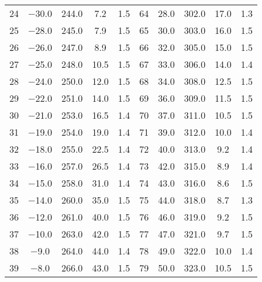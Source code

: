\begin{table}
\begin{tabular}{S S S S S | S S S S S}
      \num{24} &  \num{-30.0} &  \num{244.0} &  \num{ 7.2 } &  \num{1.5} & \num{64} &  \num{ 28.0} &  \num{302.0} &  \num{17.0 } &  \num{1.3} \\ 
      \num{25} &  \num{-28.0} &  \num{245.0} &  \num{ 7.9 } &  \num{1.5} & \num{65} &  \num{ 30.0} &  \num{303.0} &  \num{16.0 } &  \num{1.5} \\ 
      \num{26} &  \num{-26.0} &  \num{247.0} &  \num{ 8.9 } &  \num{1.5} & \num{66} &  \num{ 32.0} &  \num{305.0} &  \num{15.0 } &  \num{1.5} \\ 
      \num{27} &  \num{-25.0} &  \num{248.0} &  \num{10.5 } &  \num{1.5} & \num{67} &  \num{ 33.0} &  \num{306.0} &  \num{14.0 } &  \num{1.4} \\ 
      \num{28} &  \num{-24.0} &  \num{250.0} &  \num{12.0 } &  \num{1.5} & \num{68} &  \num{ 34.0} &  \num{308.0} &  \num{12.5 } &  \num{1.5} \\ 
      \num{29} &  \num{-22.0} &  \num{251.0} &  \num{14.0 } &  \num{1.5} & \num{69} &  \num{ 36.0} &  \num{309.0} &  \num{11.5 } &  \num{1.5} \\ 
      \num{30} &  \num{-21.0} &  \num{253.0} &  \num{16.5 } &  \num{1.4} & \num{70} &  \num{ 37.0} &  \num{311.0} &  \num{10.5 } &  \num{1.5} \\ 
      \num{31} &  \num{-19.0} &  \num{254.0} &  \num{19.0 } &  \num{1.4} & \num{71} &  \num{ 39.0} &  \num{312.0} &  \num{10.0 } &  \num{1.4} \\ 
      \num{32} &  \num{-18.0} &  \num{255.0} &  \num{22.5 } &  \num{1.4} & \num{72} &  \num{ 40.0} &  \num{313.0} &  \num{ 9.2 } &  \num{1.4} \\ 
      \num{33} &  \num{-16.0} &  \num{257.0} &  \num{26.5 } &  \num{1.4} & \num{73} &  \num{ 42.0} &  \num{315.0} &  \num{ 8.9 } &  \num{1.4} \\ 
      \num{34} &  \num{-15.0} &  \num{258.0} &  \num{31.0 } &  \num{1.4} & \num{74} &  \num{ 43.0} &  \num{316.0} &  \num{ 8.6 } &  \num{1.5} \\ 
      \num{35} &  \num{-14.0} &  \num{260.0} &  \num{35.0 } &  \num{1.5} & \num{75} &  \num{ 44.0} &  \num{318.0} &  \num{ 8.7 } &  \num{1.3} \\ 
      \num{36} &  \num{-12.0} &  \num{261.0} &  \num{40.0 } &  \num{1.5} & \num{76} &  \num{ 46.0} &  \num{319.0} &  \num{ 9.2 } &  \num{1.5} \\ 
      \num{37} &  \num{-10.0} &  \num{263.0} &  \num{42.0 } &  \num{1.5} & \num{77} &  \num{ 47.0} &  \num{321.0} &  \num{ 9.7 } &  \num{1.5} \\ 
      \num{38} &  \num{ -9.0} &  \num{264.0} &  \num{44.0 } &  \num{1.4} & \num{78} &  \num{ 49.0} &  \num{322.0} &  \num{10.0 } &  \num{1.4} \\ 
      \num{39} &  \num{ -8.0} &  \num{266.0} &  \num{43.0 } &  \num{1.5} & \num{79} &  \num{ 50.0} &  \num{323.0} &  \num{10.5 } &  \num{1.5} \\ 
      \bottomrule
    \end{tabular}
  \end{table}


